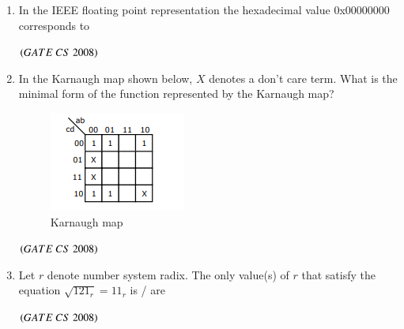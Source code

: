\documentclass[journal]{IEEEtran}
\numberwithin{equation}{enumi}
\numberwithin{figure}{enumi}
\begin{document}
\begin{enumerate}
\item In the IEEE floating point representation the hexadecimal value 0x00000000 corresponds to
 \begin{enumerate} 
\end{enumerate}
\hfill $\left(GATE\ CS\  2008\right)$

\item In the Karnaugh map shown below, \(X\) denotes a don't care term.  
What is the minimal form of the function represented by the Karnaugh map?
\begin{figure}[H]
    \centering
    \includegraphics[width=0.5\columnwidth]{figs/fig1.png}
    \caption{Karnaugh map}
    \label{fig:1}
   \end{figure}
\begin{enumerate}
\end{enumerate}
\hfill $\left(GATE\ CS\  2008\right)$

\item Let $r$ denote number system radix. The only value(s) of $r$ that satisfy the equation $\sqrt{121_r}= 11_r$ is / are 
\begin{enumerate}
\end{enumerate}
\hfill $\left(GATE\ CS\  2008\right)$


\end{enumerate}
\end{document}

